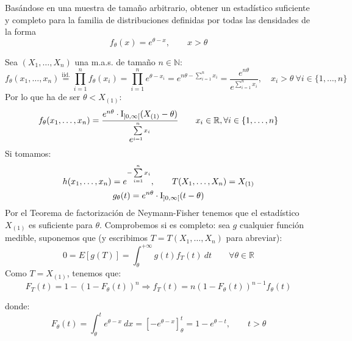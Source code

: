 \begin{ejercicio}
    Basándose en una muestra de tamaño arbitrario, obtener un estadístico suficiente y completo para la familia de distribuciones definidas por todas las densidades de la forma
    \begin{equation*}
        f_\theta(x) = e^{\theta-x}, \qquad x>\theta
    \end{equation*}

    \noindent
    Sea $(X_1, \ldots, X_n)$ una m.a.s. de tamaño $n\in \mathbb{N}$: 
    \begin{equation*}
        f_{\theta}(x_1, \ldots, x_n)  \stackrel{\text{iid.}}{=} \prod_{i=1}^{n}f_\theta(x_i) = \prod_{i=1}^{n}e^{\theta - x_i} = e^{n\theta - \sum\limits_{i=1}^{n}x_i} = \dfrac{e^{n\theta}}{e^{\sum\limits_{i=1}^n x_i}}, \quad x_i > \theta\ \forall i \in \{1,\ldots,n\}
    \end{equation*}
    Por lo que ha de ser $\theta < X_{(1)}$:
    \begin{equation*}
        f_{\theta}(x_1, \ldots, x_n) = \dfrac{e^{n\theta}\cdot \operatorname{I}_{\left]0, \infty\right[}(X_{(1)}-\theta)}{e^{\sum\limits_{i=1}^n x_i}}\qquad x_i\in \mathbb{R}, \forall i \in \{1,\ldots,n\}
    \end{equation*}
    Si tomamos:
    \begin{gather*}
        h(x_1, \ldots, x_n) = e^{-\sum\limits_{i=1}^n x_i}, \qquad T(X_1, \ldots, X_n) = X_{(1)} \\
        g_\theta(t) = e^{n\theta}\cdot \operatorname{I}_{\left]0, \infty\right[}(t-\theta)
    \end{gather*}
    Por el Teorema de factorización de Neymann-Fisher tenemos que el estadístico $X_{(1)}$ es suficiente para $\theta$. Comprobemos si es completo: sea $g$ cualquier función medible, suponemos que (y escribimos $T=T(X_1, \ldots, X_n)$ para abreviar):
    \begin{equation*}
        0 = E[g(T)] = \int_{\theta}^{+\infty} g(t)f_T(t) ~dt  \qquad \forall \theta \in \mathbb{R}
    \end{equation*}
    Como $T=X_{(1)}$, tenemos que:
    \begin{equation*}
        F_T(t) = 1-{(1-F_\theta(t))}^{n} \Longrightarrow f_T(t) = n{(1-F_\theta(t))}^{n-1}f_\theta(t)
    \end{equation*}

    donde:
    \begin{equation*}
        F_\theta(t) = \int_{\theta}^{t} e^{\theta-x} ~dx  = \left[-e^{\theta-x}\right]_{\theta}^t = 1-e^{\theta-t}, \qquad t>\theta
    \end{equation*}


\end{ejercicio}
